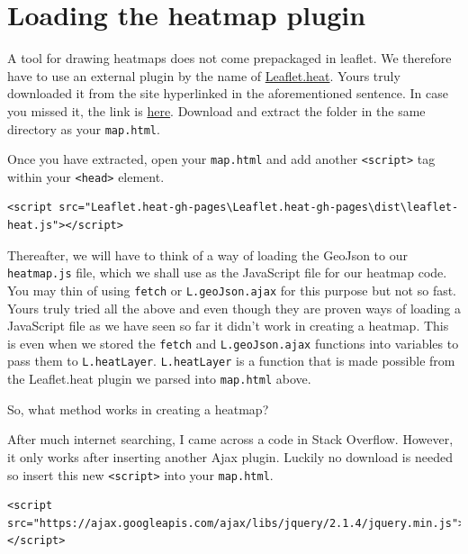 \documentclass[
]{book}
\begin{document}
\hypertarget{loading-the-heatmap-plugin}{%
\section{Loading the heatmap plugin}\label{loading-the-heatmap-plugin}}

A tool for drawing heatmaps does not come prepackaged in leaflet. We therefore have to use an external plugin by the name of \href{https://github.com/Leaflet/Leaflet.heat}{Leaflet.heat}. Yours truly downloaded it from the site hyperlinked in the aforementioned sentence. In case you missed it, the link is \href{https://codeload.github.com/Leaflet/Leaflet.heat/zip/refs/heads/gh-pages}{here}. Download and extract the folder in the same directory as your \texttt{map.html}.

Once you have extracted, open your \texttt{map.html} and add another \texttt{\textless{}script\textgreater{}} tag within your \texttt{\textless{}head\textgreater{}} element.

\begin{verbatim}
<script src="Leaflet.heat-gh-pages\Leaflet.heat-gh-pages\dist\leaflet-heat.js"></script>
\end{verbatim}

Thereafter, we will have to think of a way of loading the GeoJson to our \texttt{heatmap.js} file, which we shall use as the JavaScript file for our heatmap code. You may thin of using \texttt{fetch} or \texttt{L.geoJson.ajax} for this purpose but not so fast. Yours truly tried all the above and even though they are proven ways of loading a JavaScript file as we have seen so far it didn't work in creating a heatmap. This is even when we stored the \texttt{fetch} and \texttt{L.geoJson.ajax} functions into variables to pass them to \texttt{L.heatLayer}. \texttt{L.heatLayer} is a function that is made possible from the Leaflet.heat plugin we parsed into \texttt{map.html} above.

So, what method works in creating a heatmap?

After much internet searching, I came across a code in Stack Overflow. However, it only works after inserting another Ajax plugin. Luckily no download is needed so insert this new \texttt{\textless{}script\textgreater{}} into your \texttt{map.html}.

\begin{verbatim}
<script src="https://ajax.googleapis.com/ajax/libs/jquery/2.1.4/jquery.min.js"></script>
\end{verbatim}
\end{document}
